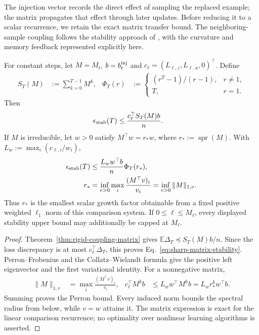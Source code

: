 The injection vector records the direct effect of sampling the replaced example; the matrix propagates that effect through later updates. Before reducing it to a scalar recurrence, we retain the exact matrix transfer bound. The neighboring-sample coupling follows the stability approach of \citet{hardt2016stability}, with the curvature and memory feedback represented explicitly here.

\begin{theorem}
\label{thm:sharp-perron-stability}
For constant steps, let $M=M_t$, $b=b_t^{\rm inj}$ and
$c_\ell=(L_{\ell,z},L_{\ell,u},0)^\top$. Define
\begin{align}
 S_T(M)&:=\sum_{k=0}^{T-1}M^k,&
 \Phi_T(r)&:=\begin{cases}(r^T-1)/(r-1),&r\ne1,\\T,&r=1.\end{cases}
\end{align}
Then
\begin{align}\label{eq:sharp-matrix-stability}
 \epsilon_{\rm stab}(T)&\le\frac{c_\ell^\top S_T(M)b}{n}.
\end{align}
If $M$ is irreducible, let $w>0$ satisfy $M^\top w=r_*w$, where $r_*:=\operatorname{spr}(M)$. With $L_w:=\max_i(c_{\ell,i}/w_i)$,
\begin{align}\label{eq:sharp-perron-stability}
 \epsilon_{\rm stab}(T)
 &\le\frac{L_ww^\top b}{n}\Phi_T(r_*),\\
 r_*&=\inf_{v>0}\max_i\frac{(M^\top v)_i}{v_i}
 =\inf_{v>0}\|M\|_{1,v}.
\end{align}
Thus $r_*$ is the smallest scalar growth factor obtainable from a fixed positive weighted $\ell_1$ norm of this comparison system. If $0\le\ell\le M_\ell$, every displayed stability upper bound may additionally be capped at $M_\ell$.
\end{theorem}
\begin{proof}
Theorem~\ref{thm:rigid-coupling-matrix} gives $\mathbb E\Delta_T\preceq S_T(M)b/n$. Since the loss discrepancy is at most $c_\ell^\top\Delta_T$, this proves Eq.~\eqref{eq:sharp-matrix-stability}. Perron--Frobenius and the Collatz--Wielandt formula \citep[Chapter~8]{horn2013matrix} give the positive left eigenvector and the first variational identity. For a nonnegative matrix,
\begin{align}
 \|M\|_{1,v}&=\max_i\frac{(M^\top v)_i}{v_i},&
 c_\ell^\top M^kb&\le L_ww^\top M^kb=L_wr_*^kw^\top b.
\end{align}
Summing proves the Perron bound. Every induced norm bounds the spectral radius from below, while $v=w$ attains it. The matrix expression is exact for the linear comparison recurrence; no optimality over nonlinear learning algorithms is asserted.
\end{proof}

